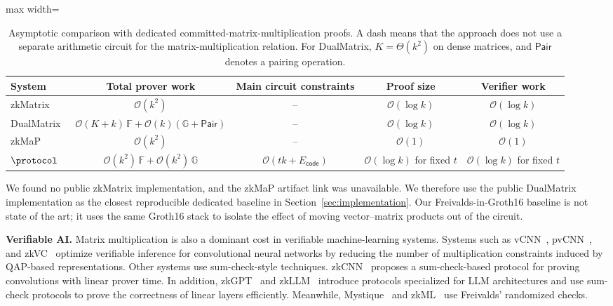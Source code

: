 \begin{table}[t]
\centering
\footnotesize
\begin{adjustbox}{max width=\textwidth}
\begin{tabular}{lcccc}
\toprule
\textbf{System} & \textbf{Total prover work} & \textbf{Main circuit constraints}
& \textbf{Proof size} & \textbf{Verifier work} \\
\midrule
zkMatrix~\cite{cong2024zkmatrix}
& \(\mathcal{O}(k^2)\) & -- & \(\mathcal{O}(\log k)\)
& \(\mathcal{O}(\log k)\) \\
DualMatrix~\cite{cong2026dualmatrix}
& \(\mathcal{O}(K+k)\,\mathbb{F}+\mathcal{O}(k)(\mathbb{G}+\mathsf{Pair})\) & --
& \(\mathcal{O}(\log k)\) & \(\mathcal{O}(\log k)\) \\
zkMaP~\cite{zkMaP}
& \(\mathcal{O}(k^2)\) & -- & \(\mathcal{O}(1)\)
& \(\mathcal{O}(1)\) \\
\(\protocol\)
& \(\mathcal{O}(k^2)\,\mathbb{F}+\mathcal{O}(k^2)\,\mathbb{G}\)
& \(\mathcal{O}(tk+E_{\mathsf{code}})\)
& \(\mathcal{O}(\log k)\) for fixed \(t\)
& \(\mathcal{O}(\log k)\) for fixed \(t\) \\
\bottomrule
\end{tabular}
\end{adjustbox}
\vspace{4pt}
\caption{Asymptotic comparison with dedicated committed-matrix-multiplication
proofs. A dash means that the approach does not use a separate arithmetic
circuit for the matrix-multiplication relation. For DualMatrix,
\(K=\Theta(k^2)\) on dense matrices, and \(\mathsf{Pair}\) denotes a pairing
operation.}
\label{tab:related-matrix-comparison}
\end{table}

We found no public zkMatrix implementation, and the zkMaP artifact link was
unavailable. We therefore use the public DualMatrix implementation as the
closest reproducible dedicated baseline in Section~\ref{sec:implementation}.
Our Freivalds-in-Groth16 baseline is not state of the art; it uses the same
Groth16 stack to isolate the effect of moving vector--matrix products out of
the circuit.

\noindent\textbf{Verifiable AI.}
Matrix multiplication is also a dominant cost in verifiable machine-learning
systems. Systems such as vCNN~\cite{lee2024vcnn}, pvCNN~\cite{pvCNN}, and
zkVC~\cite{zhang2025zkvc} optimize verifiable inference for convolutional neural
networks by reducing the number of multiplication constraints induced by
QAP-based representations. Other systems use sum-check-style techniques.
zkCNN~\cite{liu2021zkcnn} proposes a sum-check-based protocol for proving
convolutions with linear prover time. In addition, zkGPT~\cite{zkGPT} and
zkLLM~\cite{zkLLM} introduce protocols specialized for LLM architectures and
use sum-check protocols to prove the correctness of linear layers efficiently.
Meanwhile, Mystique~\cite{weng2021mystique} and zkML~\cite{chen2024zkml} use
Freivalds' randomized checks.

